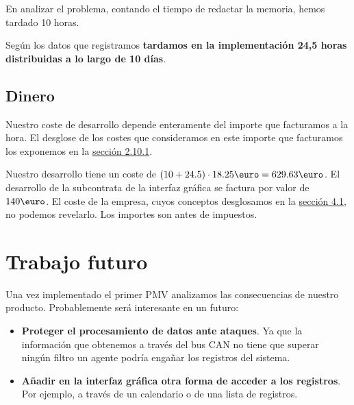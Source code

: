 En analizar el problema, contando el tiempo de redactar la memoria,
hemos tardado 10 horas.

Según los datos que registramos \textbf{tardamos en la implementación 24,5 horas distribuidas a lo largo de
10 días}.

\subsection{Dinero}

Nuestro coste de desarrollo depende enteramente del importe que
facturamos a la hora. El desglose de los costes que consideramos
en este importe que facturamos los exponemos en la
\hyperref[sec:precio_hora]{sección 2.10.1}.

Nuestro desarrollo tiene un coste de $(10 + 24.5) \cdot 18.25\mbox{\euro} = 629.63\mbox{\euro}$. 
El desarrollo de la subcontrata de la interfaz gráfica se factura por valor de $140\mbox{\euro}$.
El coste de la empresa, cuyos conceptos desglosamos en la \hyperref[sec:estimación_de_costes]{sección 4.1},
no podemos revelarlo.
Los importes son antes de impuestos.

\section{Trabajo futuro}

Una vez implementado el primer PMV analizamos las consecuencias de
nuestro producto. Probablemente será interesante en un futuro:

\begin{itemize}[noitemsep,nolistsep]
    \item \textbf{Proteger el procesamiento de datos ante ataques}. Ya que
          la información que obtenemos a través del bus CAN no
          tiene que superar ningún filtro un agente podría engañar
          los registros del sistema.
    \item \textbf{Añadir en la interfaz gráfica otra forma de acceder a los
          registros}. Por ejemplo, a través de un calendario o de una
          lista de registros.
\end{itemize}
